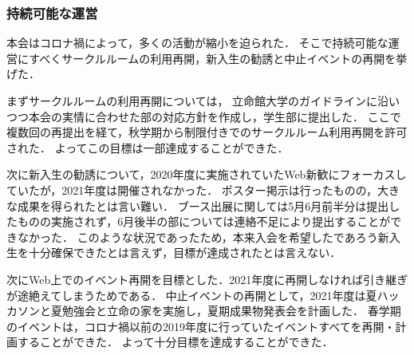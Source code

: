 \subsubsection*{持続可能な運営}
    本会はコロナ禍によって，多くの活動が縮小を迫られた．
    そこで持続可能な運営にすべくサークルルームの利用再開，新入生の勧誘と中止イベントの再開を挙げた．
    
    まずサークルルームの利用再開については，
    立命館大学のガイドラインに沿いつつ本会の実情に合わせた部の対応方針を作成し，学生部に提出した．
    ここで複数回の再提出を経て，秋学期から制限付きでのサークルルーム利用再開を許可された．
    よってこの目標は一部達成することができた．
    
    次に新入生の勧誘について，2020年度に実施されていたWeb新歓にフォーカスしていたが，2021年度は開催されなかった．
    ポスター掲示は行ったものの，大きな成果を得られたとは言い難い．
    ブース出展に関しては5月6月前半分は提出したものの実施されず，6月後半の部については連絡不足により提出することができなかった．
    このような状況であったため，本来入会を希望したであろう新入生を十分確保できたとは言えず，目標が達成されたとは言えない．
    
    次にWeb上でのイベント再開を目標とした．2021年度に再開しなければ引き継ぎが途絶えてしまうためである．
    中止イベントの再開として，2021年度は夏ハッカソンと夏勉強会と立命の家を実施し，夏期成果物発表会を計画した．
    春学期のイベントは，コロナ禍以前の2019年度に行っていたイベントすべてを再開・計画することができた．
    よって十分目標を達成することができた．
    